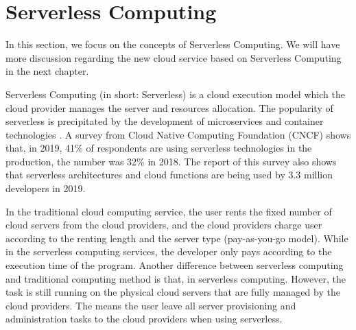 \section{Serverless Computing}
In this section, we focus on the concepts of Serverless Computing. We will have more discussion regarding the new cloud service based on Serverless Computing in the next chapter.
\par
Serverless Computing (in short: Serverless) is a cloud execution model which the cloud provider manages the server and resources allocation. 
The popularity of serverless is precipitated by the development of microservices and container technologies \cite{baldini2017serverless}. A survey from Cloud Native Computing Foundation (CNCF) shows that, in 2019, 41\% of respondents are using serverless technologies in the production, the number was 32\% in 2018\cite{cncf2020}. The report of this survey also shows that serverless architectures and cloud functions are being used by 3.3 million developers \cite{cncf2020} in 2019.
\par
In the traditional cloud computing service, the user rents the fixed number of cloud servers from the cloud providers, and the cloud providers charge user according to the renting length and the server type (pay-as-you-go model). While in the serverless computing services, the developer only pays according to the execution time of the program. 
Another difference between serverless computing and traditional computing method is that, in serverless computing. However, the task is still running on the physical cloud servers that are fully managed by the cloud providers. The means the user leave all server provisioning and administration tasks to the cloud providers \cite{jonas2019cloud} when using serverless.

